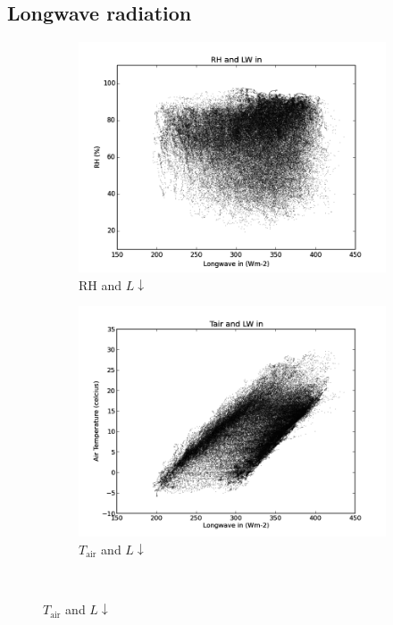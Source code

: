 \documentclass[a4paper,titlepage, twoside]{report}
\newcommand\Ldown{L\!\!\downarrow}
\begin{document}
\subsection{Longwave radiation}
\begin{figure}
\centering
\begin{subfigure}{0.48\textwidth}
\includegraphics[width=\textwidth]{001_LW_RH.png}
\caption{$\mathrm{RH}$ and $\Ldown$}
\end{subfigure}
\hfill
\begin{subfigure}{0.48\textwidth}
\includegraphics[width=\textwidth]{002_LW_Tair.png}
\caption{$T_\mathrm{air}$ and $\Ldown$}
\end{subfigure}
\\

\end{figure}
\end{document}
